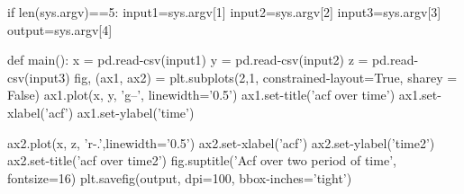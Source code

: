 \documentclass[12pt, a4paper, twoside]{report}
\begin{document}
if len(sys.argv)==5:\newline
\hspace*{10mm }   input1=sys.argv[1]\newline
\hspace*{10mm }  input2=sys.argv[2]\newline
\hspace*{10mm }   input3=sys.argv[3]\newline
\hspace*{10mm }   output=sys.argv[4]\newline


def main():\newline
\hspace*{10mm}   x = pd.read-csv(input1)\newline
\hspace*{10mm}   y = pd.read-csv(input2)\newline
\hspace*{10mm}   z = pd.read-csv(input3)\newline
\hspace*{10mm}   fig, (ax1, ax2) = plt.subplots(2,1, constrained-layout=True, sharey = False)\newline
\hspace*{10mm}    ax1.plot(x, y, 'g--', linewidth='0.5')\newline
\hspace*{10mm}    ax1.set-title('acf over time')\newline
\hspace*{10mm}    ax1.set-xlabel('acf')\newline
\hspace*{10mm}    ax1.set-ylabel('time')\newline
 
\hspace*{10mm}    ax2.plot(x, z, 'r-.',linewidth='0.5')\newline
\hspace*{10mm}    ax2.set-xlabel('acf')\newline
\hspace*{10mm}    ax2.set-ylabel('time2')\newline
\hspace*{10mm}    ax2.set-title('acf over time2')\newline
\hspace*{10mm}     fig.suptitle('Acf over two period of time', fontsize=16)\newline
\hspace*{10mm}     plt.savefig(output, dpi=100, bbox-inches='tight')\newline
\end{document}
